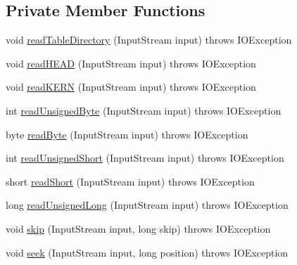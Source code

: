 \subsection*{Private Member Functions}
\begin{DoxyCompactItemize}
\item 
void \mbox{\hyperlink{classorg_1_1newdawn_1_1slick_1_1tools_1_1hiero_1_1_kerning_a07ee19cb53c5f0230a1eb88cb2d4ce75}{read\+Table\+Directory}} (Input\+Stream input)  throws I\+O\+Exception 
\item 
void \mbox{\hyperlink{classorg_1_1newdawn_1_1slick_1_1tools_1_1hiero_1_1_kerning_a3d1d60d638972f0b47916b296b11a82b}{read\+H\+E\+AD}} (Input\+Stream input)  throws I\+O\+Exception 
\item 
void \mbox{\hyperlink{classorg_1_1newdawn_1_1slick_1_1tools_1_1hiero_1_1_kerning_a36ce80f85555679417f5ba367ca4987a}{read\+K\+E\+RN}} (Input\+Stream input)  throws I\+O\+Exception 
\item 
int \mbox{\hyperlink{classorg_1_1newdawn_1_1slick_1_1tools_1_1hiero_1_1_kerning_a433922be5e8ae2ea7ebecc17adb480d1}{read\+Unsigned\+Byte}} (Input\+Stream input)  throws I\+O\+Exception 
\item 
byte \mbox{\hyperlink{classorg_1_1newdawn_1_1slick_1_1tools_1_1hiero_1_1_kerning_a226c7723ee9c8d6269c67b8e6ac45d13}{read\+Byte}} (Input\+Stream input)  throws I\+O\+Exception 
\item 
int \mbox{\hyperlink{classorg_1_1newdawn_1_1slick_1_1tools_1_1hiero_1_1_kerning_a8e409fe133f0b1741ba0c5a52ef13910}{read\+Unsigned\+Short}} (Input\+Stream input)  throws I\+O\+Exception 
\item 
short \mbox{\hyperlink{classorg_1_1newdawn_1_1slick_1_1tools_1_1hiero_1_1_kerning_a85a04fa801cb219c4555d38195ca6d47}{read\+Short}} (Input\+Stream input)  throws I\+O\+Exception 
\item 
long \mbox{\hyperlink{classorg_1_1newdawn_1_1slick_1_1tools_1_1hiero_1_1_kerning_aa3c458b9468029d2e7d2a1eccba11453}{read\+Unsigned\+Long}} (Input\+Stream input)  throws I\+O\+Exception 
\item 
void \mbox{\hyperlink{classorg_1_1newdawn_1_1slick_1_1tools_1_1hiero_1_1_kerning_afa04157519725497f528b5bc175f1abb}{skip}} (Input\+Stream input, long skip)  throws I\+O\+Exception 
\item 
void \mbox{\hyperlink{classorg_1_1newdawn_1_1slick_1_1tools_1_1hiero_1_1_kerning_a67a8ed1a557f152dab4fe70c02c1a5e9}{seek}} (Input\+Stream input, long position)  throws I\+O\+Exception 
\end{DoxyCompactItemize}
